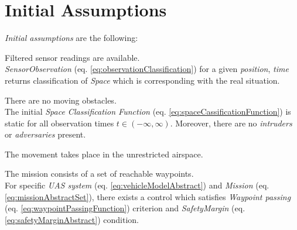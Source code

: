 \newpage
\section{Initial Assumptions} \label{s:initialAssumptions}
    \noindent\emph{Initial assumptions} are the following:

    \begin{assumption}
        {Filtered sensor readings are available}\label{ass:filteredSensors}.\\
        \emph{SensorObservation} (eq. \ref{eq:observationClassification}) for a given \emph{position}, \emph{time} returns classification of \emph{Space} which is corresponding with the real situation.
    \end{assumption}
    
    \begin{assumption}
        {There are no moving obstacles}\label{ass:noMovingObstacles}.\\
        The initial \emph{Space Classification Function} (eq. \ref{eq:spaceCassificationFunction}) is static for all observation times $t \in (-\infty,\infty)$. Moreover, there are no \emph{intruders} or \emph{adversaries} present. 
    \end{assumption}

    \begin{assumption}
        {The movement takes place in the unrestricted airspace.}\label{ass:openAir}
    \end{assumption}

    \begin{assumption}
        {The mission consists of a set of reachable waypoints}\label{ass:reachableWaypoints}.\\
        For specific \emph{UAS system} (eq. \ref{eq:vehicleModelAbstract}) and  \emph{Mission} (eq. \ref{eq:missionAbstractSet}), there exists a control which satisfies \emph{Waypoint passing} (eq. \ref{eq:waypointPassingFunction}) criterion and \emph{SafetyMargin} (eq. \ref{eq:safetyMarginAbstract}) condition.
    \end{assumption}
    
